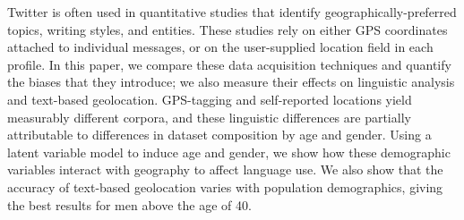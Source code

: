Twitter is often used in quantitative studies that identify geographically-preferred topics, writing styles, and entities. These studies rely on either GPS coordinates attached to individual messages, or on the user-supplied location field in each profile. In this paper, we compare these data acquisition techniques and quantify the biases that they introduce; we also measure their effects on linguistic analysis and text-based geolocation. GPS-tagging and self-reported locations yield measurably different corpora, and these linguistic differences are partially attributable to differences in dataset composition by age and gender. Using a latent variable model to induce age and gender, we show how these demographic variables interact with geography to affect language use. We also show that the accuracy of text-based geolocation varies with population demographics, giving the best results for men above the age of 40.
